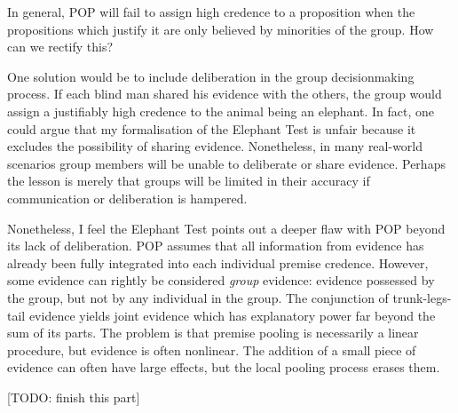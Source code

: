 \documentclass{article}
\begin{document}
In general, POP will fail to assign high credence to a proposition when the propositions which justify it are only believed by minorities of the group. How can we rectify this?

One solution would be to include deliberation in the group decisionmaking process. If each blind man shared his evidence with the others, the group would assign a justifiably high credence to the animal being an elephant. In fact, one could argue that my formalisation of the Elephant Test is unfair because it excludes the possibility of sharing evidence. Nonetheless, in many real-world scenarios group members will be unable to deliberate or share evidence. Perhaps the lesson is merely that groups will be limited in their accuracy if communication or deliberation is hampered. 

Nonetheless, I feel the Elephant Test points out a deeper flaw with POP beyond its lack of deliberation. POP assumes that all information from evidence has already been fully integrated into each individual premise credence. However, some evidence can rightly be considered \textit{group} evidence: evidence possessed by the group, but not by any individual in the group. The conjunction of trunk-legs-tail evidence yields joint evidence which has explanatory power far beyond the sum of its parts. The problem is that premise pooling is necessarily a linear procedure, but evidence is often nonlinear. The addition of a small piece of evidence can often have large effects, but the local pooling process erases them. 

[TODO: finish this part]




\end{document}
